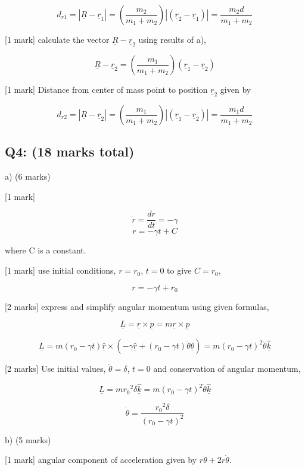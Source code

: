 \documentclass[a4paper,11pt]{article}
\begin{document}
\[ d_{r1} = | \underline{R} - \underline{r}_1 | = \left( \frac{m_2}{m_1+m_2} \right )|(\underline{r}_2 - \underline{r}_1) | = \frac{m_2 d}{m_1+m_2} \]

[1 mark] calculate the vector \( \underline{R} - \underline{r}_2 \) using results of a), 

\[ \underline{R} - \underline{r}_2 = \left( \frac{m_1}{m_1+m_2} \right )(\underline{r}_1 - \underline{r}_2) \]

[1 mark] Distance from center of mass point to position \( \underline{r}_2 \) given by 

\[ d_{r2} = | \underline{R} - \underline{r}_2 | = \left( \frac{m_1}{m_1+m_2} \right )|(\underline{r}_1 - \underline{r}_2) | = \frac{m_1 d}{m_1+m_2} \]

\subsection*{Q4: (18 marks total)}

a) (6 marks)

[1 mark] 

\[ \dot{r} = \frac{dr}{dt} = - \gamma \]
\[ r = - \gamma t + C \]

where C is a constant.

[1 mark] use initial conditions, \( r = r_0 \), \( t = 0 \) to give \( C = r_0 \), 

\[ r = - \gamma t + r_0 \]

[2 marks] express and simplify angular momentum using given formulas, 

\[ \underline{L} = \underline{r} \times \underline{p} = m \underline{r} \times \underline{p} \]

\[ \underline{L} = m (r_0 - \gamma t) \hat{\underline{r}} \times \left ( - \gamma \hat{\underline{r}} + (r_0 - \gamma t ) \dot{\theta} \hat{\underline{\theta}} \right ) = m (r_0 - \gamma t)^2 \dot{\theta} \hat{\underline{k}} \]

[2 marks] Use initial values, \( \dot{\theta} = \delta \), \(t = 0 \) and conservation of angular momentum, 

\[ \underline{L}  = m {r_0}^2 \delta \hat{\underline{k}} = m (r_0 - \gamma t)^2 \dot{\theta} \hat{\underline{k}} \]

\[ \dot{\theta} = \frac{{r_0}^2 \delta}{(r_0 - \gamma t)^2} \]

b) (5 marks)

[1 mark] angular component of acceleration given by  \( r \ddot{\theta} + 2\dot{r}\dot{\theta} \).
\end{document}
